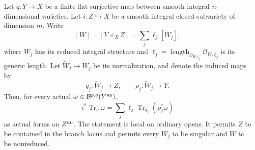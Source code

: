 \begin{theorem}
\label{g10t:form-base-change}
Let $q:Y\to X$ be a finite flat surjective map between smooth
integral $n$-dimensional varieties. Let $i:Z\hookrightarrow X$
be a smooth integral closed subvariety of dimension $m$. Write
\[
        [W]=[Y\times_X Z]=\sum_j\ell_j[W_j],
\]
where $W_j$ has its reduced integral structure and
$\ell_j=\operatorname{length}_{\mathcal O_{W,\xi_j}}
\mathcal O_{W,\xi_j}$ is its generic length. Let
$\widetilde W_j\to W_j$ be its normalization, and denote the
induced maps by
\[
             q_j:\widetilde W_j\to Z,
        \qquad \rho_j:\widetilde W_j\to Y.
\]
Then, for every actual $\omega\in\mathcal B^{p,q}(Y^{\rm an})$,
\[
 \boxed{\quad
 i^*\operatorname{Tr}_q\omega
       =\sum_j\ell_j\operatorname{Tr}_{q_j}(\rho_j^*\omega)
       \quad}
\tag{G10.T2}\label{g10t:form-base-change-eq}
\]
as actual forms on $Z^{\rm an}$. The statement is local on
ordinary opens. It permits $Z$ to be contained in the branch
locus and permits every $W_j$ to be singular and $W$ to be
nonreduced.
\end{theorem}

